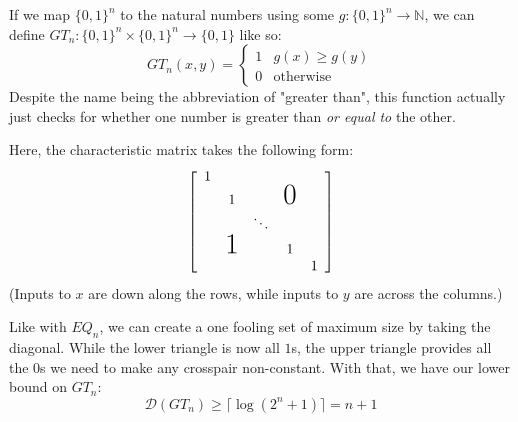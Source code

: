 \documentclass[letterpaper]{article}
\begin{document}
\begin{example}
    If we map $\{0, 1\}^n$ to the natural numbers using some $g: \{0, 1\}^n \to \mathbb{N}$,
    we can define $GT_n: \{0, 1\}^n \times \{0, 1\}^n \to \{0, 1\}$ like so:
    \[GT_n(x, y)=\begin{cases}
            1 & g(x) \ge g(y)    \\
            0 & \text{otherwise}
        \end{cases}\]
    Despite the name being the abbreviation of "greater than", this function
    actually just checks for whether one number is greater than \textit{or equal to} the other.

    Here, the characteristic matrix takes the following form:
    \[
        \left[
            \begin{array}{ccccc}
                1                                             \\
                 & 1             &        & \text{\huge0}     \\
                 &               & \ddots                     \\
                 & \text{\huge1} &        & 1                 \\
                 &               &        &               & 1
            \end{array}
            \right]
    \]
    (Inputs to $x$ are down along the rows, while inputs to $y$ are across the columns.)

    Like with $EQ_n$, we can create a one fooling set of maximum size by taking the diagonal.
    While the lower triangle is now all $1$s, the upper triangle provides all the $0$s
    we need to make any crosspair non-constant.
    With that, we have our lower bound on $GT_n$:
    \[\mathcal{D}(GT_n) \ge \lceil\log\left(2^n+1\right)\rceil = n+1\]
\end{example}
\end{document}
